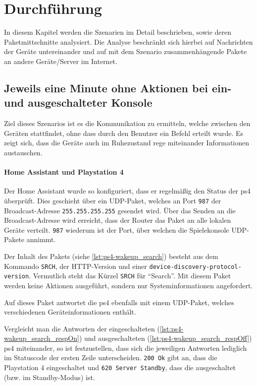 \newpage
\section{Durchführung}\label{sec:durchfuehrung}
In diesem Kapitel werden die Szenarien im Detail beschrieben,
sowie deren Paketmittschnitte analysiert.
Die Analyse beschränkt sich hierbei auf Nachrichten der Geräte untereinander
und auf mit dem Szenario zusammenhängende Pakete an andere Geräte/Server im Internet.

\subsection{Jeweils eine Minute ohne Aktionen bei ein- und ausgeschalteter Konsole}\label{sec:durchfuehrung-aus}
Ziel dieses Szenarios ist es die Kommunikation zu ermitteln,
welche zwischen den Geräten stattfindet,
ohne dass durch den Benutzer ein Befehl erteilt wurde.
Es zeigt sich, dass die Geräte auch im Ruhezustand rege miteinander Informationen austauschen.

\paragraph{Home Assistant und Playstation 4}
Der Home Assistant wurde so konfiguriert,
dass er regelmäßig den Status der \ac{ps4} überprüft.
Dies geschieht über ein UDP-Paket,
welches an Port \texttt{987} der Broadcast-Adresse \texttt{255.255.255.255} gesendet wird.
Über das Senden an die Broadcast-Adresse wird erreicht,
dass der Router das Paket an alle lokalen Geräte verteilt.
\texttt{987} wiederum ist der Port, über welchen die Spielekonsole UDP-Pakete annimmt.

Der Inhalt des Pakets (siehe \autoref{lst:ps4-wakeup_search}) besteht aus dem Kommando \texttt{SRCH},
der HTTP-Version und einer \texttt{device-discovery-protocol-version}.
Vermutlich steht das Kürzel \texttt{SRCH} für \enquote{Search}.
Mit diesem Paket werden keine Aktionen ausgeführt,
sondern nur Systeminformationen angefordert.



\newpage

Auf dieses Paket antwortet die \ac{ps4} ebenfalls mit einem UDP-Paket,
welches verschiedenen Geräteinformationen enthält.

Vergleicht man die Antworten der eingeschalteten (\autoref{lst:ps4-wakeup_search_respOn})
und ausgeschalteten (\autoref{lst:ps4-wakeup_search_respOff}) \ac{ps4} miteinander,
so ist festzustellen,
dass sich die jeweiligen Antworten lediglich im Statuscode der ersten Zeile unterscheiden.
\texttt{200 Ok} gibt an, dass die Playstation 4 eingeschaltet und \texttt{620 Server Standby},
dass die ausgeschaltet (bzw. im Standby-Modus) ist.

